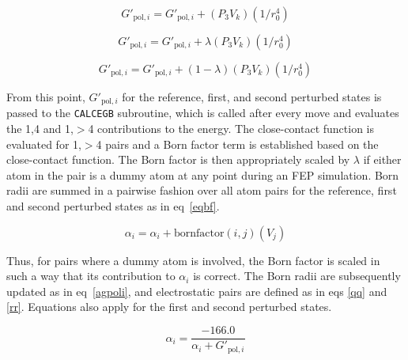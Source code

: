 \documentclass[12pt]{report}
\def\equlab{eq}\def\equslab{Eqs.}
\newcommand*\eq[1]{\equlab~\ref{#1}}
\begin{document}
\vspace*{-0.6cm}
\begin{equation}
\label{buildpoli5}
G'_{ \textrm{pol},i} = G'_{ \textrm{pol},i} + (P_{3}V_{k})(1/r^{4}_{0})
\end{equation}
\vspace*{-1.65cm}

\begin{equation}
\label{buildpoli6}
G'_{ \textrm{pol},i} = G'_{ \textrm{pol},i} + \lambda(P_{3}V_{k})(1/r^{4}_{0})
\end{equation}
\vspace*{-1.65cm}

\begin{equation}
\label{buildpoli7}
G'_{ \textrm{pol},i} = G'_{ \textrm{pol},i} + (1-\lambda)(P_{3}V_{k})(1/r^{4}_{0})
\end{equation}
\vspace*{-0.7cm}

From this point, $G'_{ \textrm{pol},i}$ for the reference, first, and second perturbed states is passed to the {\tt CALCEGB} subroutine, which is called after every move and evaluates the 1,4 and 1,$>$4 contributions to the energy. The close-contact function is evaluated for 1,$>$4 pairs and a Born factor term is established based on the close-contact function. The Born factor is then appropriately scaled by $\lambda$ if either atom in the pair is a dummy atom at any point during an FEP simulation. Born radii are summed in a pairwise fashion over all atom pairs for the reference, first and second perturbed states as in \eq{eqbf}.

\vspace*{-0.5cm}
\begin{equation}
\label{eqbf}
\alpha_{i} = \alpha_{i} + \textrm{bornfactor}(i,j)(V_{j})
\end{equation}
\vspace*{-0.8cm}

Thus, for pairs where a dummy atom is involved, the Born factor is scaled in such a way that its contribution to $\alpha_{i}$ is correct. The Born radii are subsequently updated as in \eq{agpoli}, and electrostatic pairs are defined as in eqs \ref{qq} and \ref{rr}. Equations also apply for the first and second perturbed states.

\vspace*{-0.3cm}
\begin{equation}
\label{agpoli}
\alpha_{i} = \frac{-166.0}{\alpha_{i} + G'_{ \textrm{pol},i}}
\end{equation}
\vspace*{-1.6cm}
\end{document}
